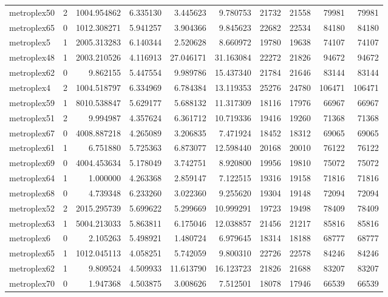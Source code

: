 \begin{longtable}{|l|r|r|r|r|r|r|r|r|r|}
metroplex50 & 2 & 1004.954862 & 6.335130 & 3.445623 & 9.780753 & 21732 & 21558 & 79981 & 79981 \\
metroplex65 & 0 & 1012.308271 & 5.941257 & 3.904366 & 9.845623 & 22682 & 22534 & 84180 & 84180 \\
metroplex5 & 1 & 2005.313283 & 6.140344 & 2.520628 & 8.660972 & 19780 & 19638 & 74107 & 74107 \\
metroplex48 & 1 & 2003.210526 & 4.116913 & 27.046171 & 31.163084 & 22272 & 21826 & 94672 & 94672 \\
metroplex62 & 0 & 9.862155 & 5.447554 & 9.989786 & 15.437340 & 21784 & 21646 & 83144 & 83144 \\
metroplex4 & 2 & 1004.518797 & 6.334969 & 6.784384 & 13.119353 & 25276 & 24780 & 106471 & 106471 \\
metroplex59 & 1 & 8010.538847 & 5.629177 & 5.688132 & 11.317309 & 18116 & 17976 & 66967 & 66967 \\
metroplex51 & 2 & 9.994987 & 4.357624 & 6.361712 & 10.719336 & 19416 & 19260 & 71368 & 71368 \\
metroplex67 & 0 & 4008.887218 & 4.265089 & 3.206835 & 7.471924 & 18452 & 18312 & 69065 & 69065 \\
metroplex61 & 1 & 6.751880 & 5.725363 & 6.873077 & 12.598440 & 20168 & 20010 & 76122 & 76122 \\
metroplex69 & 0 & 4004.453634 & 5.178049 & 3.742751 & 8.920800 & 19956 & 19810 & 75072 & 75072 \\
metroplex64 & 1 & 1.000000 & 4.263368 & 2.859147 & 7.122515 & 19316 & 19158 & 71816 & 71816 \\
metroplex68 & 0 & 4.739348 & 6.233260 & 3.022360 & 9.255620 & 19304 & 19148 & 72094 & 72094 \\
metroplex52 & 2 & 2015.295739 & 5.699622 & 5.299669 & 10.999291 & 19723 & 19498 & 78409 & 78409 \\
metroplex63 & 1 & 5004.213033 & 5.863811 & 6.175046 & 12.038857 & 21456 & 21217 & 85816 & 85816 \\
metroplex6 & 0 & 2.105263 & 5.498921 & 1.480724 & 6.979645 & 18314 & 18188 & 68777 & 68777 \\
metroplex65 & 1 & 1012.045113 & 4.058251 & 5.742059 & 9.800310 & 22726 & 22578 & 84246 & 84246 \\
metroplex62 & 1 & 9.809524 & 4.509933 & 11.613790 & 16.123723 & 21826 & 21688 & 83207 & 83207 \\
metroplex70 & 0 & 1.947368 & 4.503875 & 3.008626 & 7.512501 & 18078 & 17946 & 66539 & 66539 \\

\end{longtable}
